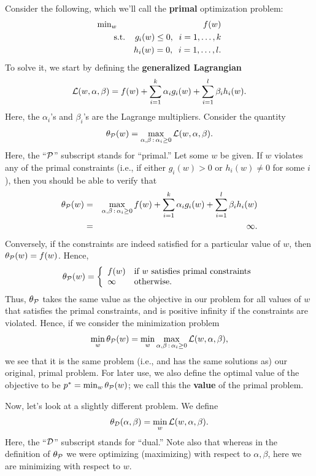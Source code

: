 \documentclass{article}
\begin{document}
Consider the following, which we'll call the {\bf primal} optimization problem:
\begin{eqnarray*}
&\hbox{min}_w& f(w) \\
&\;\;\;\;\;\;\;\hbox{s.t.}& g_i(w) \leq 0, \;\; i=1, \ldots, k \\
&& h_i(w) =  0, \;\; i=1, \ldots, l.
\end{eqnarray*}
To solve it, we start by defining the {\bf generalized Lagrangian}
\[
{\cal L}(w,\alpha,\beta) = f(w) + \sum_{i=1}^k \alpha_i g_i(w) + \sum_{i=1}^l \beta_i h_i(w).
\]
Here, the $\alpha_i$'s and $\beta_i$'s are the Lagrange multipliers.
Consider the quantity
\[
\theta_{\cal P}(w) = \max_{ \alpha, \beta\, :\, \alpha_i \geq 0 } {\cal L}(w,\alpha,\beta).
\]
Here, the ``${\cal P}$'' subscript stands for ``primal.''  Let some $w$ be given.  If $w$ violates
any of the primal constraints (i.e., if either $g_i(w) > 0$ or $h_i(w) \neq 0$ for some $i$), then
you should be able to verify that
\begin{eqnarray}
\theta_{\cal P}(w) &=& \max_{ \alpha, \beta\, :\, \alpha_i \geq 0 } f(w) + \sum_{i=1}^k \alpha_i g_i(w) + \sum_{i=1}^l \beta_i h_i(w) \\
&=& \infty.
\end{eqnarray}
Conversely, if the constraints are indeed satisfied for a particular value of $w$, then $\theta_{\cal P}(w) = f(w)$. Hence,
\[
\theta_{\cal P}(w) = \left\{ \begin{array}{ll} f(w)  & \hbox{if $w$ satisfies primal constraints} \\
					   \infty & \hbox{otherwise}. \end{array} \right.
\]
Thus, $\theta_{\cal P}$ takes the same value as the objective in our problem for all values of $w$ that
satisfies the primal constraints, and is positive infinity if the constraints are violated.  Hence, if we
consider the minimization problem
\[
\min_w \theta_{\cal P}(w) =
\min_w \max_{ \alpha, \beta\, :\, \alpha_i \geq 0 } {\cal L}(w,\alpha,\beta),
\]
we see that it is the same problem (i.e., and has the same solutions as) our original, primal problem.
For later use, we also define the optimal value of the objective to
be ${p^{\ast}} = \min_w \theta_{\cal P}(w)$;
we call this the {\bf value} of the primal problem.

Now, let's look at a slightly different problem. We define
\[
\theta_{\cal D}(\alpha, \beta) = \min_w {\cal L}(w,\alpha,\beta).
\]
Here, the ``${\cal D}$'' subscript stands for ``dual.''  Note also that whereas in the
definition of $\theta_{\cal P}$ we were optimizing (maximizing) with respect to $\alpha, \beta$,
here we are minimizing with respect to $w$.
\end{document}
